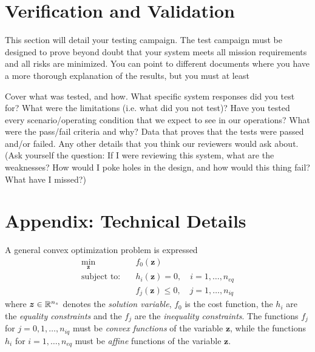 \documentclass[10pt]{article}
\begin{document}

\section{Verification and Validation}\label{sec:v_and_v}

This section will detail your testing campaign. The test campaign must be designed to prove beyond doubt that your system meets all mission requirements and all risks are minimized. You can point to different documents where you have a more thorough explanation of the results, but you must at least

Cover what was tested, and how. What specific system responses did you test for? What were the limitations (i.e. what did you not test)? Have you tested every scenario/operating condition that we expect to see in our operations?  What were the pass/fail criteria and why?
Data that proves that the tests were passed and/or failed. 
Any other details that you think our reviewers would ask about. (Ask yourself the question: If I were reviewing this system, what are the weaknesses? How would I poke holes in the design, and how would this thing fail? What have I missed?)


\clearpage
\section*{Appendix: Technical Details}

A general convex optimization problem is expressed
\begin{subequations}
\begin{align}
\min_{\bm{z}} &\quad f_0(\bm{z}) \\
\text{subject to:} &\quad h_i(\bm{z}) = 0, \quad i=1,\ldots,n_{eq} \\
&\quad f_j(\bm{z}) \leq 0, \quad j = 1,\ldots,n_{iq}
\end{align}
\end{subequations}
where $\bm{z}\in{\mathbb{R}}^{n_z}$ denotes the \textit{solution variable}, $f_0$ is the cost function, the $h_i$ are the \textit{equality constraints} and the $f_j$ are the \textit{inequality constraints}. The functions $f_j$ for $j=0,1,\ldots,n_{iq}$ must be \textit{convex functions} of the variable $\bm{z}$, while the functions $h_i$ for $i=1,\ldots,n_{eq}$ must be \textit{affine} functions of the variable $\bm{z}$.
\end{document}
